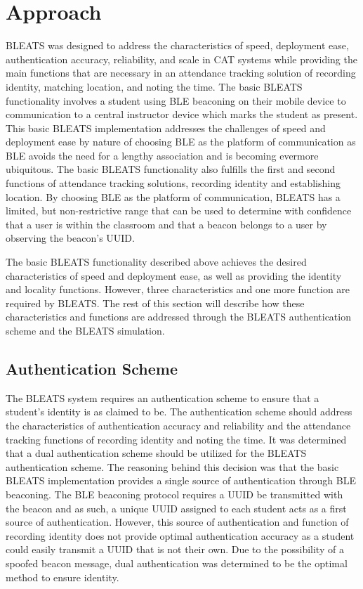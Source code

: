 \section{Approach}

\label{sec:approach}

BLEATS was designed to address the characteristics of speed, deployment ease,
authentication accuracy, reliability, and scale in CAT systems while providing
the main functions that are necessary in an attendance tracking solution of
recording identity, matching location, and noting the time. The basic BLEATS
functionality involves a student using BLE beaconing on their mobile device to
communication to a central instructor device which marks the student as
present. This basic BLEATS implementation addresses the challenges of speed and
deployment ease by nature of choosing BLE as the platform of communication as
BLE avoids the need for a lengthy association and is becoming evermore
ubiquitous. The basic BLEATS functionality also fulfills the first and second
functions of attendance tracking solutions, recording identity and establishing
location. By choosing BLE as the platform of communication, BLEATS has a
limited, but non-restrictive range that can be used to determine with
confidence that a user is within the classroom and that a beacon belongs to a
user by observing the beacon’s UUID.

The basic BLEATS functionality described above achieves the desired
characteristics of speed and deployment ease,  as well as providing the
identity and locality functions. However, three characteristics and one more
function are required by BLEATS. The rest of this section will describe how
these characteristics and functions are addressed through the BLEATS
authentication scheme and the BLEATS simulation.

\subsection{Authentication Scheme}

The BLEATS system requires an authentication scheme to ensure that a student’s
identity is as claimed to be. The authentication scheme should address the
characteristics of authentication accuracy and reliability and the attendance
tracking functions of recording identity and noting the time. It was determined
that a dual authentication scheme should be utilized for the BLEATS
authentication scheme. The reasoning behind this decision was that the basic
BLEATS implementation provides a single source of authentication through BLE
beaconing. The BLE beaconing protocol requires a UUID be transmitted with the
beacon and as such, a unique UUID assigned to each student acts as a first
source of authentication. However, this source of authentication and function
of recording identity does not provide optimal authentication accuracy as a
student could easily transmit a UUID that is not their own. Due to the
possibility of a spoofed beacon message, dual authentication was determined to
be the optimal method to ensure identity. 

